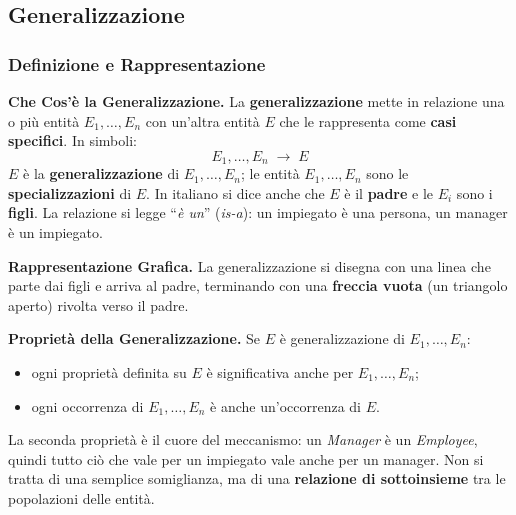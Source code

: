 \documentclass[12pt]{extarticle}
\begin{document}
\subsection{Generalizzazione}

\subsubsection{Definizione e Rappresentazione}

\noindent \textbf{Che Cos'è la Generalizzazione.} La \textbf{generalizzazione} mette in relazione una o più entità $E_1, \dots, E_n$ con un'altra entità $E$ che le rappresenta come \textbf{casi specifici}. In simboli:
\[
E_1, \dots, E_n \;\longrightarrow\; E
\]
$E$ è la \textbf{generalizzazione} di $E_1, \dots, E_n$; le entità $E_1, \dots, E_n$ sono le \textbf{specializzazioni} di $E$. In italiano si dice anche che $E$ è il \textbf{padre} e le $E_i$ sono i \textbf{figli}. La relazione si legge ``\textit{è un}'' (\textit{is-a}): un impiegato è una persona, un manager è un impiegato.

\medskip
\noindent \textbf{Rappresentazione Grafica.} La generalizzazione si disegna con una linea che parte dai figli e arriva al padre, terminando con una \textbf{freccia vuota} (un triangolo aperto) rivolta verso il padre.

\begin{center}
\end{center}


\medskip
\noindent \textbf{Proprietà della Generalizzazione.} Se $E$ è generalizzazione di $E_1, \dots, E_n$:
\begin{itemize}
    \item ogni proprietà definita su $E$ è significativa anche per $E_1, \dots, E_n$;
    \item ogni occorrenza di $E_1, \dots, E_n$ è anche un'occorrenza di $E$.
\end{itemize}
La seconda proprietà è il cuore del meccanismo: un \textit{Manager} è un \textit{Employee}, quindi tutto ciò che vale per un impiegato vale anche per un manager. Non si tratta di una semplice somiglianza, ma di una \textbf{relazione di sottoinsieme} tra le popolazioni delle entità.
\end{document}
